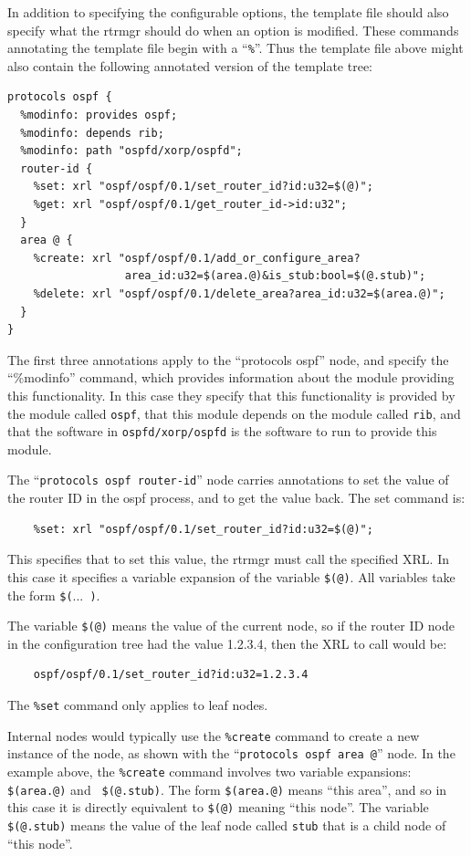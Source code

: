 \documentclass[11pt]{article}
\begin{document}
In addition to specifying the configurable options, the template file
should also specify what the rtrmgr should do when an option is
modified.  These commands annotating the template file begin with a
``{\tt \%}''.  Thus the template file above might also contain the
following annotated version of the template tree:
\begin{verbatim}
protocols ospf {
  %modinfo: provides ospf;
  %modinfo: depends rib;
  %modinfo: path "ospfd/xorp/ospfd";
  router-id {
    %set: xrl "ospf/ospf/0.1/set_router_id?id:u32=$(@)";
    %get: xrl "ospf/ospf/0.1/get_router_id->id:u32";
  }
  area @ {
    %create: xrl "ospf/ospf/0.1/add_or_configure_area?
                  area_id:u32=$(area.@)&is_stub:bool=$(@.stub)";
    %delete: xrl "ospf/ospf/0.1/delete_area?area_id:u32=$(area.@)";
  }
}
\end{verbatim}
The first three annotations apply to the ``protocols ospf'' node, and
specify the ``\%modinfo'' command, which provides information about
the module providing this functionality.  In this case they specify
that this functionality is provided by the module called {\tt ospf},
that this module depends on the module called {\tt rib}, and that the
software in {\tt ospfd/xorp/ospfd} is the software to run to
provide this module.

The ``{\tt protocols ospf router-id}'' node carries annotations to set
the value of the router ID in the ospf process, and to get the value
back.  The set command is:
\begin{verbatim}
    %set: xrl "ospf/ospf/0.1/set_router_id?id:u32=$(@)";
\end{verbatim}
This specifies that to set this value, the rtrmgr must call the
specified XRL.  In this case it specifies a variable expansion of the
variable {\tt \$(@)}.  All variables take the form {\tt \$(}...{\tt
)}.   

The variable {\tt \$(@)} means the value of the
current node, so if the router ID node in the configuration tree had
the value 1.2.3.4, then the XRL to call would be:
\begin{verbatim}
    ospf/ospf/0.1/set_router_id?id:u32=1.2.3.4
\end{verbatim}
The {\tt \%set} command only applies to leaf nodes.  

Internal nodes would typically use the {\tt \%create} command to
create a new instance of the node, as shown with the ``{\tt protocols ospf
area @}'' node.  In the example above, the {\tt \%create} command
involves two variable expansions: {\tt \$(area.@)} and {\tt
\$(@.stub)}.  The form {\tt \$(area.@)} means ``this area'', and so
in this case it is directly equivalent to {\tt \$(@)} meaning ``this node''.
The variable {\tt \$(@.stub)} means the value of the leaf node called
{\tt stub} that is a child node of ``this node''.
\end{document}

